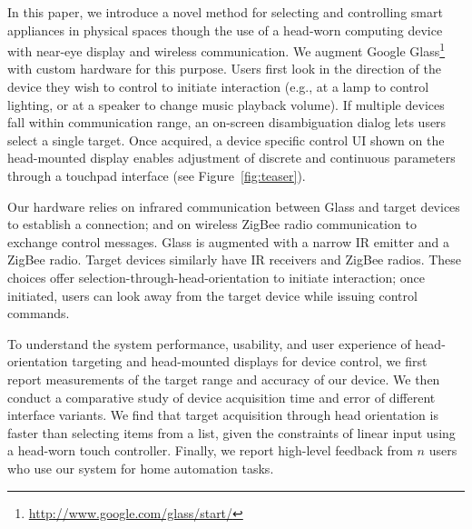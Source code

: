 In this paper, we introduce a novel method for selecting and controlling smart appliances in physical spaces though the use of a head-worn computing device with near-eye display and wireless communication. We augment Google Glass\footnote{\url{http://www.google.com/glass/start/}} with custom hardware for this purpose. Users first look in the direction of the device they wish to control to initiate interaction (e.g., at a lamp to control lighting, or at a speaker to change music playback volume). If multiple devices fall within communication range, an on-screen disambiguation dialog lets users select a single target.  Once acquired, a device specific control UI shown on the head-mounted display enables adjustment of discrete and continuous parameters through a touchpad interface (see Figure~\ref{fig:teaser}).

Our hardware relies on infrared communication between Glass and target devices to establish a connection; and on wireless ZigBee radio communication to exchange control messages.  Glass is augmented with a narrow IR emitter and a ZigBee radio. Target devices similarly have IR receivers and ZigBee radios. These choices offer selection-through-head-orientation to initiate interaction; once initiated, users can look away from the target device while issuing control commands.

To understand the system performance, usability, and user experience of head-orientation targeting and head-mounted displays for device control, we first report measurements of the target range and accuracy of our device. We then conduct a comparative study of device acquisition time and error of different interface variants. We find that target acquisition through head orientation is faster than selecting items from a list, given the constraints of linear input using a head-worn touch controller. Finally, we report high-level feedback from $n$ users who use our system for home automation tasks.



